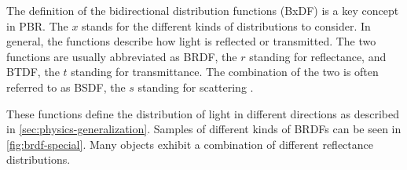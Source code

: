The definition of the bidirectional distribution functions (\gls{BxDF}) is a key concept in \gls{PBR}. The $x$ stands for the different kinds of distributions to consider. In general, the functions describe how light is reflected or transmitted. The two functions are usually abbreviated as \gls{BRDF}, the $r$ standing for reflectance, and \gls{BTDF}, the $t$ standing for transmittance. The combination of the two is often referred to as \gls{BSDF}, the $s$ standing for scattering \cite{Pharr_Physically_Based_Rendering_2023}.

These functions define the distribution of light in different directions as described in \autoref{sec:physics-generalization}. Samples of different kinds of \glspl{BRDF} can be seen in \autoref{fig:brdf-special}. Many objects exhibit a combination of different reflectance distributions.

